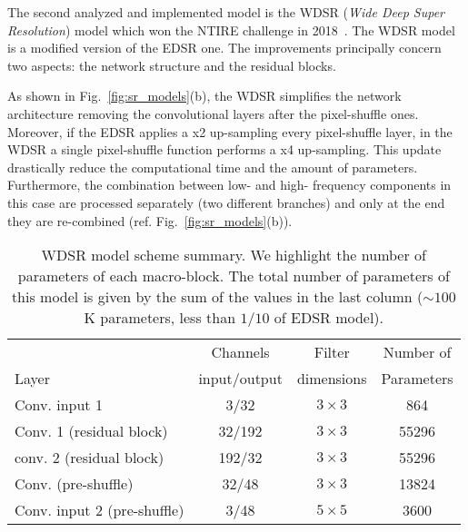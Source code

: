 \documentclass{standalone}
\begin{document}
The second analyzed and implemented model is the WDSR (\emph{Wide Deep Super Resolution}) model which won the NTIRE challenge in 2018~\cite{}.
The WDSR model is a modified version of the EDSR one.
The improvements principally concern two aspects: the network structure and the residual blocks.

As shown in Fig.~\ref{fig:sr_models}(b), the WDSR simplifies the network architecture removing the convolutional layers after the pixel-shuffle ones.
Moreover, if the EDSR applies a x2 up-sampling every pixel-shuffle layer, in the WDSR a single pixel-shuffle function performs a x4 up-sampling.
This update drastically reduce the computational time and the amount of parameters.
Furthermore, the combination between low- and high- frequency components in this case are processed separately (two different branches) and only at the end they are re-combined (ref. Fig.~\ref{fig:sr_models}(b)).

\begin{table}[htbp]
\centering
\begin{tabular}{lccc}
\hline \rowcolor{darkgrayrow}
                            &  Channels     & Filter     & Number of    \\
\rowcolor{darkgrayrow}
Layer                       & input/output  & dimensions & Parameters   \\
\hline
Conv. input 1               & 3/32       & $3\times3$   & 864     \\
Conv. 1 (residual block)    & 32/192     & $3\times3$   & 55296   \\
conv. 2 (residual block)    & 192/32     & $3\times3$   & 55296   \\
Conv. (pre-shuffle)         & 32/48      & $3\times3$   & 13824   \\
Conv. input 2 (pre-shuffle) & 3/48       & $5\times5$   & 3600    \\
\hline
\end{tabular}
\caption{WDSR model scheme summary.
We highlight the number of parameters of each macro-block.
The total number of parameters of this model is given by the sum of the values in the last column ($\sim100$K parameters, less than $1/10$ of EDSR model).
}
\label{tab:wdsr}
\end{table}
\end{document}
